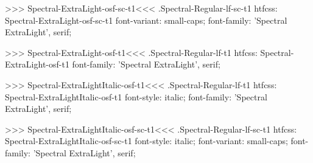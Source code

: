 >>>
\<Spectral-ExtraLight-osf-sc-t1\><<<
.Spectral-Regular-lf-sc-t1
htfcss:  Spectral-ExtraLight-osf-sc-t1  font-variant: small-caps; font-family: 'Spectral ExtraLight', serif;

>>>
\<Spectral-ExtraLight-osf-t1\><<<
.Spectral-Regular-lf-t1
htfcss:  Spectral-ExtraLight-osf-t1  font-family: 'Spectral ExtraLight', serif;

>>>
\<Spectral-ExtraLightItalic-osf-t1\><<<
.Spectral-Regular-lf-t1
htfcss:  Spectral-ExtraLightItalic-osf-t1  font-style: italic; font-family: 'Spectral ExtraLight', serif;

>>>
\<Spectral-ExtraLightItalic-osf-sc-t1\><<<
.Spectral-Regular-lf-sc-t1
htfcss:  Spectral-ExtraLightItalic-osf-sc-t1  font-style: italic; font-variant: small-caps; font-family: 'Spectral ExtraLight', serif;

